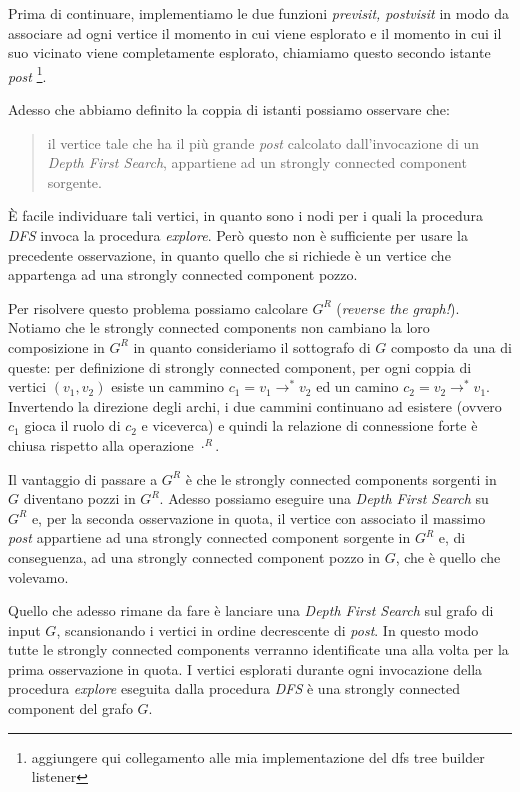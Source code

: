 Prima di continuare, implementiamo le due funzioni \emph{previsit,
  postvisit} in modo da associare ad ogni vertice il momento in cui
viene esplorato e il momento in cui il suo vicinato viene
completamente esplorato, chiamiamo questo secondo istante \emph{post}
\footnote{aggiungere qui collegamento alle mia implementazione del dfs
  tree builder listener}.

Adesso che abbiamo definito la coppia di istanti possiamo osservare
che: 
\begin{quotation}
  il vertice tale che ha il pi\`u grande \emph{post} calcolato
  dall'invocazione di un \emph{Depth First Search}, appartiene ad un
  strongly connected component sorgente.
\end{quotation}

\`E facile individuare tali vertici, in quanto sono i nodi per i quali
la procedura \emph{DFS} invoca la procedura \emph{explore}. Per\`o
questo non \`e sufficiente per usare la precedente osservazione, in
quanto quello che si richiede \`e un vertice che appartenga ad una
strongly connected component pozzo.

Per risolvere questo problema possiamo calcolare $G^{R}$
(\emph{reverse the graph!}). Notiamo che le strongly connected
components non cambiano la loro composizione in $G^{R}$ in quanto
consideriamo il sottografo di $G$ composto da una di queste: per
definizione di strongly connected component, per ogni coppia di
vertici $(v_{1}, v_{2})$ esiste un cammino $c_{1} =
v_{1}\rightarrow^{*} v_{2}$ ed un camino $c_{2} = v_{2}\rightarrow^{*}
v_{1}$. Invertendo la direzione degli archi, i due cammini continuano
ad esistere (ovvero $c_{1}$ gioca il ruolo di $c_{2}$ e viceverca) e
quindi la relazione di connessione forte \`e chiusa rispetto alla
operazione $\cdot ^{R}$.

Il vantaggio di passare a $G^{R}$ \`e che le strongly connected
components sorgenti in $G$ diventano pozzi in $G^{R}$. Adesso possiamo
eseguire una \emph{Depth First Search} su $G^{R}$ e, per la seconda
osservazione in quota, il vertice con associato il massimo \emph{post}
appartiene ad una strongly connected component sorgente in $G^{R}$ e,
di conseguenza, ad una strongly connected component pozzo in $G$, che
\`e quello che volevamo.

Quello che adesso rimane da fare \`e lanciare una \emph{Depth First
  Search} sul grafo di input $G$, scansionando i vertici in ordine
decrescente di \emph{post}. In questo modo tutte le strongly connected
components verranno identificate una alla volta per la prima
osservazione in quota. I vertici esplorati durante ogni invocazione
della procedura \emph{explore} eseguita dalla procedura \emph{DFS} \`e
una strongly connected component del grafo $G$.

